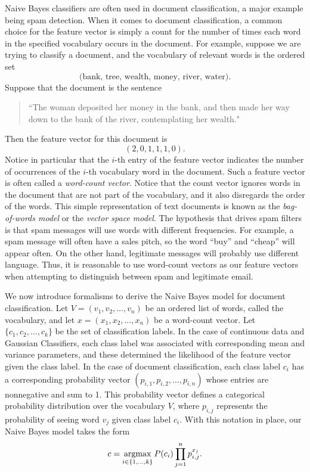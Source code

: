 Naive Bayes classifiers are often used in document classification, a major example being spam detection.
When it comes to document classification, a common choice for the feature vector
is simply a count for the number of times each word in the specified vocabulary occurs in the document.
For example, suppose we are trying to classify a document, and the vocabulary of relevant words is the ordered set
\[
\text{(bank, tree, wealth, money, river, water)}.
\]
Suppose that the document is the sentence
\begin{quotation}
``The woman deposited her money in the bank, and then made her way down to the bank of the river, contemplating her wealth."
\end{quotation}
Then the feature vector for this document is
\[
(2, 0, 1, 1, 1, 0).
\]
Notice in particular that the $i$-th entry of the feature vector indicates the number of occurrences of the $i$-th
vocabulary word in the document.
Such a feature vector is often called a \emph{word-count vector}.
Notice that the count vector ignores words in the document that are not part of the vocabulary, and
it also disregards the order of the words.
This simple representation of text documents is known as the \emph{bag-of-words model} or the \emph{vector space model}.
The hypothesis that drives spam filters is that spam messages will use words with different frequencies.
For example, a spam message will often have a sales pitch, so the word ``buy'' and ``cheap'' will appear often.
On the other hand, legitimate messages will probably use different language.
Thus, it is reasonable to use word-count vectors as our feature vectors when attempting to distinguish between spam and
legitimate email.

We now introduce formalisms to derive the Naive Bayes model for document classification.
Let $V = (v_1,v_2,\ldots,v_n)$ be an ordered list of words, called the vocabulary, and let
$x = (x_1,x_2,\ldots,x_n)$ be a word-count vector.
Let $\{c_1,c_2,\ldots,c_k\}$ be the set of classification labels.
In the case of continuous data and Gaussian Classifiers, each class label was associated with corresponding
mean and variance parameters, and these determined the likelihood of the feature vector given the class label.
In the case of document classification, each class label $c_i$ has a corresponding probability vector
$(p_{i,1}, p_{i,2}, \ldots, p_{i,n})$ whose entries are nonnegative and sum to 1.
This probability vector defines a categorical probability distribution over the vocabulary $V$, where $p_{i,j}$
represents the probability of seeing word $v_j$ given class label $c_i$.
With this notation in place, our Naive Bayes model takes the form
\[
c = \underset{i \in \{1, \ldots, k\}}{\mbox{argmax}}\, P(c_i)\prod_{j=1}^n p_{i,j}^{x_j}.
\]

